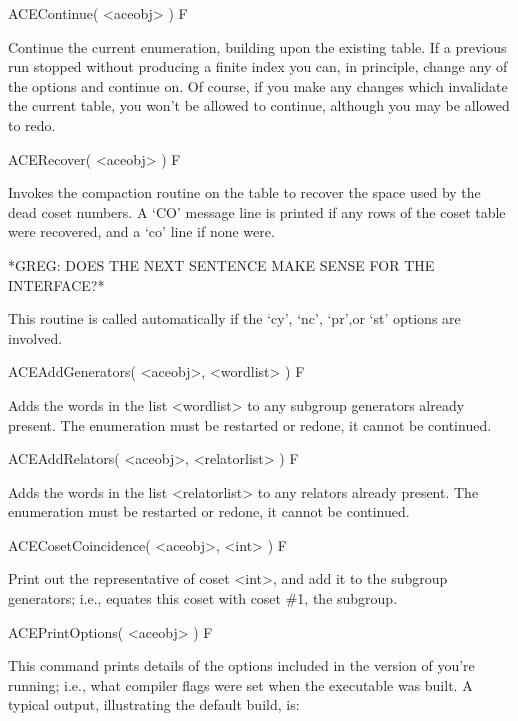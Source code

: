 \>ACEContinue( <aceobj> ) F

Continue the  current enumeration,  building upon the  existing table.
If a previous run stopped without producing a finite index you can, in
principle, change any  of the options and continue  on.  Of course,
if you make any changes  which invalidate the current table, you won't
be allowed to continue, although you may be allowed to redo.


\>ACERecover( <aceobj> ) F

Invokes the compaction routine on the table to recover the space  used
by the dead coset numbers. A `CO' message line is printed if any  rows
of the coset table were recovered, and a `co' line if none were.

*GREG: DOES THE NEXT SENTENCE MAKE SENSE FOR THE INTERFACE?*

This routine is  called automatically if the `cy',  `nc', `pr',or `st'
options are involved.


\>ACEAddGenerators( <aceobj>, <wordlist> ) F

Adds the words in the list <wordlist> to any subgroup generators already
present.
The enumeration must be restarted or redone, it cannot be continued.

\>ACEAddRelators( <aceobj>, <relatorlist> ) F

Adds the words in the list <relatorlist> to any relators already present.
The enumeration must be restarted or redone, it cannot be continued.

\>ACECosetCoincidence( <aceobj>, <int> ) F

Print out the representative of coset <int>, and add it to the
subgroup generators; i.e., equates this coset with coset \#1, the
subgroup.



% 

\>ACEPrintOptions( <aceobj> ) F

This command prints details of the options included  in the version of
{\ACE} you're  running; i.e.,  what compiler flags  were set  when the
executable  was built.   A  typical output,  illustrating the  default
build, is:

